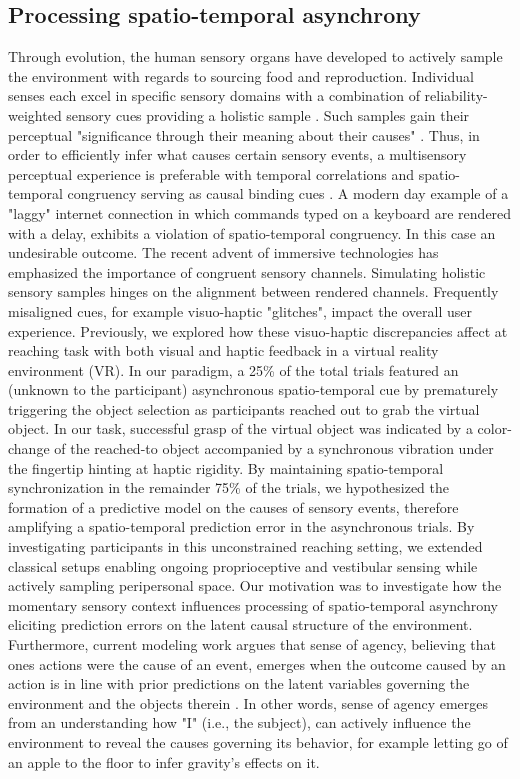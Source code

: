 \subsection{Processing spatio-temporal asynchrony}
Through evolution, the human sensory organs have developed to actively sample the environment with regards to sourcing food and reproduction. Individual senses each excel in specific sensory domains with a combination of reliability-weighted sensory cues providing a holistic sample \cite{Fetsch2012, Cao2019}. Such samples gain their perceptual "significance through their meaning about their causes" \cite{Kording2007}. Thus, in order to efficiently infer what causes certain sensory events, a multisensory perceptual experience is preferable with temporal correlations and spatio-temporal congruency serving as causal binding cues \cite{Robertson2003}. A modern day example of a "laggy" internet connection in which commands typed on a keyboard are rendered with a delay, exhibits a violation of spatio-temporal congruency. In this case an undesirable outcome. The recent advent of immersive technologies has emphasized the importance of congruent sensory channels. Simulating holistic sensory samples hinges on the alignment between rendered channels. Frequently misaligned cues, for example visuo-haptic "glitches", impact the overall user experience. Previously, we explored how these visuo-haptic discrepancies affect at  reaching task with both visual and haptic feedback in a virtual reality environment (VR)\cite{Gehrke2019}. In our paradigm, a 25\% of the total trials featured an (unknown to the participant) asynchronous spatio-temporal cue by prematurely triggering the object selection as participants reached out to grab the virtual object. In our task, successful grasp of the virtual object was indicated by a color-change of the reached-to object accompanied by a synchronous vibration under the fingertip hinting at haptic rigidity. By maintaining spatio-temporal synchronization in the remainder 75\% of the trials, we hypothesized the formation of a predictive model on the causes of sensory events, therefore amplifying a spatio-temporal prediction error in the asynchronous trials. By investigating participants in this unconstrained reaching setting, we extended classical setups enabling ongoing proprioceptive and vestibular sensing while actively sampling peripersonal space. Our motivation was to investigate how the momentary sensory context influences processing of spatio-temporal asynchrony eliciting prediction errors on the latent causal structure of the environment. Furthermore, current modeling work argues that sense of agency, believing that ones actions were the cause of an event, emerges when the outcome caused by an action is in line with prior predictions on the latent variables governing the environment and the objects therein \cite{Moore2016, Legaspi2019}. In other words, sense of agency emerges from an understanding how "I" (i.e., the subject), can actively influence the environment to reveal the causes governing its behavior, for example letting go of an apple to the floor to infer gravity's effects on it.


